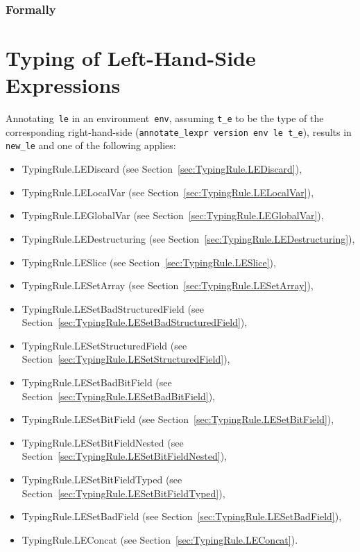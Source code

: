 \documentclass{book}
\begin{document}
\begin{emptyformal}
  \subsection{Formally}
\end{emptyformal}



\chapter{Typing of Left-Hand-Side Expressions}
Annotating~\texttt{le} in an environment~\texttt{env}, assuming \texttt{t\_e}
to be the type of the corresponding right-hand-side (\texttt{annotate\_lexpr
version env le t\_e}), results in \texttt{new\_le} and one of the following
applies:
\begin{itemize}
\item TypingRule.LEDiscard (see Section~\ref{sec:TypingRule.LEDiscard}),
\item TypingRule.LELocalVar (see Section~\ref{sec:TypingRule.LELocalVar}),
\item TypingRule.LEGlobalVar (see Section~\ref{sec:TypingRule.LEGlobalVar}),
\item TypingRule.LEDestructuring (see Section~\ref{sec:TypingRule.LEDestructuring}),
\item TypingRule.LESlice (see Section~\ref{sec:TypingRule.LESlice}),
\item TypingRule.LESetArray (see Section~\ref{sec:TypingRule.LESetArray}),
\item TypingRule.LESetBadStructuredField (see Section~\ref{sec:TypingRule.LESetBadStructuredField}),
\item TypingRule.LESetStructuredField (see Section~\ref{sec:TypingRule.LESetStructuredField}),
\item TypingRule.LESetBadBitField (see Section~\ref{sec:TypingRule.LESetBadBitField}),
\item TypingRule.LESetBitField (see Section~\ref{sec:TypingRule.LESetBitField}),
\item TypingRule.LESetBitFieldNested (see Section~\ref{sec:TypingRule.LESetBitFieldNested}),
\item TypingRule.LESetBitFieldTyped (see Section~\ref{sec:TypingRule.LESetBitFieldTyped}),
\item TypingRule.LESetBadField (see Section~\ref{sec:TypingRule.LESetBadField}),
\item TypingRule.LEConcat (see Section~\ref{sec:TypingRule.LEConcat}).
\end{itemize}
\end{document}
